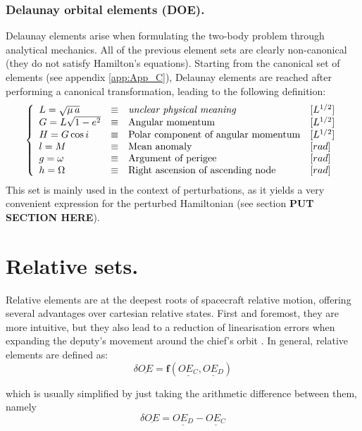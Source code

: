 	\subsubsection{Delaunay orbital elements (DOE).}
	\indent Delaunay elements arise when formulating the two-body problem through analytical mechanics. All of the previous element sets are clearly non-canonical (\ie they do not satisfy Hamilton's equations). Starting from the canonical set of elements (see appendix \ref{app:App_C}), Delaunay elements are reached after performing a canonical transformation, leading to the following definition:
	\begin{equation}
	\left\{ 
	\begin{array}{llll}
	L = \sqrt{\mu \, a} & \equiv & \text{\textit{unclear physical meaning}} & [L^{1/2}]\\
	G = L \sqrt{1 - e^2}  & \equiv & \text{Angular momentum} & [L^{1/2}]\\
	H = G \cos i  &  \equiv & \text{Polar component of angular momentum} & [L^{1/2}]\\
	l = M & \equiv & \text{Mean anomaly} & [rad]\\
	g = \omega & \equiv & \text{Argument of perigee} & [rad]\\
	h = \Omega & \equiv & \text{Right ascension of ascending node}& [rad]\\
	\end{array}
	\right.
	\end{equation}
	\indent This set is mainly used in the context of perturbations, as it yields a very convenient expression for the perturbed Hamiltonian (see section \textbf{PUT SECTION HERE}). 
%
\section{Relative sets.}
%
\indent Relative elements are at the deepest roots of spacecraft relative motion, offering several advantages over cartesian relative states. First and foremost, they are more intuitive, but they also lead to a reduction of linearisation errors when expanding the deputy's movement around the chief's orbit \cite{Gaias_mean2osc}. In general, relative elements are defined as:
%
\begin{equation}
\delta \underline{OE} = \bm{f} \left( \underline{OE_C}, \underline{OE_D} \right)
\label{eq:	ROE_def}
\end{equation}

%
\noindent which is usually simplified by just taking the arithmetic difference between them, namely
%
\begin{equation}
\delta \underline{OE} = \underline{OE_D} - \underline{OE_C}
\label{eq: OED}
\end{equation}

